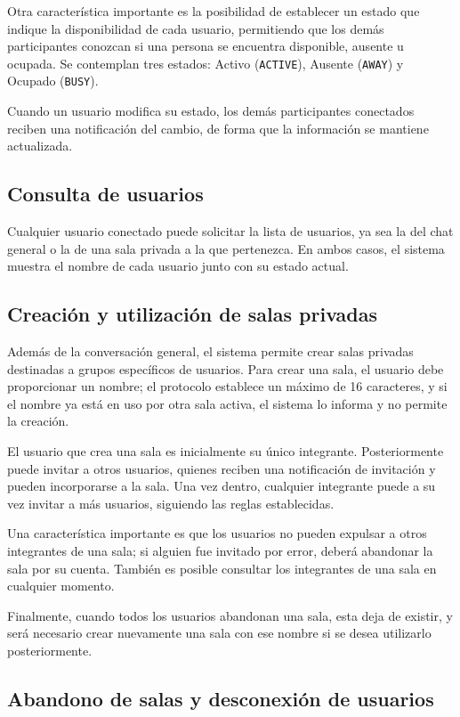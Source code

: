 \documentclass[12pt,letterpaper]{article}
\begin{document}
Otra característica importante es la posibilidad de establecer un
estado que indique la disponibilidad de cada usuario, permitiendo que
los demás participantes conozcan si una persona se encuentra
disponible, ausente u ocupada. Se contemplan tres estados: Activo
(\texttt{ACTIVE}), Ausente (\texttt{AWAY}) y Ocupado (\texttt{BUSY}).

Cuando un usuario modifica su estado, los demás participantes conectados
reciben una notificación del cambio, de forma que la información se
mantiene actualizada.

\subsection{Consulta de usuarios}

Cualquier usuario conectado puede solicitar la lista de usuarios, ya sea
la del chat general o la de una sala privada a la que pertenezca. En
ambos casos, el sistema muestra el nombre de cada usuario junto con su
estado actual.

\subsection{Creación y utilización de salas privadas}

Además de la conversación general, el sistema permite crear salas
privadas destinadas a grupos específicos de usuarios. Para crear una
sala, el usuario debe proporcionar un nombre; el protocolo establece un
máximo de 16 caracteres, y si el nombre ya está en uso por otra sala
activa, el sistema lo informa y no permite la creación.

El usuario que crea una sala es inicialmente su único integrante.
Posteriormente puede invitar a otros usuarios, quienes reciben una
notificación de invitación y pueden incorporarse a la sala. Una vez
dentro, cualquier integrante puede a su vez invitar a más usuarios,
siguiendo las reglas establecidas.

Una característica importante es que los usuarios no pueden expulsar a
otros integrantes de una sala; si alguien fue invitado por error, deberá
abandonar la sala por su cuenta. También es posible consultar los
integrantes de una sala en cualquier momento.

Finalmente, cuando todos los usuarios abandonan una sala, esta deja de
existir, y será necesario crear nuevamente una sala con ese nombre si se
desea utilizarlo posteriormente.

\subsection{Abandono de salas y desconexión de usuarios}
\end{document}

